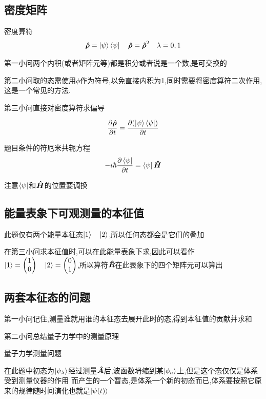 \documentclass{article}
\begin{document}
        \subsection{密度矩阵}

        \begin{formal}
            密度算符
            $$ \vu*{\rho} = \ket{\psi} \bra{\psi} \quad \vu*{\rho} =  \vu*{\rho}^{2} \quad \lambda = 0,1$$
        \end{formal}
            第一小问两个内积(或者矩阵元等)都是积分或者说是一个数,是可交换的
            
            第二小问取的态需使用$\phi$作为符号,以免直接内积为1,同时需要将密度算符二次作用,这是一个常见的方法.

            第三小问直接对密度算符求偏导

            $$ \pdv{\vu*{\rho}}{t} = \pdv{(\ket{\psi} \bra{\psi})}{t} $$

            题目条件的符厄米共轭方程
            $$ -i\hbar \pdv{\bra{\psi}}{t} = \bra{\psi} \vu*{H}  $$

            注意$\bra{\psi}$和$\vu*{H}$的位置要调换
        \subsection{能量表象下可观测量的本征值}
            此题仅有两个能量本征态$\ket{1} \quad \ket{2}$,所以任何态都会是它们的叠加

            在第三小问求本征值时,可以在此能量表象下求,因此可以看作$\ket{1} = \mqty(1 \\ 0) \quad \ket{2} = \mqty(0 \\ 1)$,所以算符$\vu*{R}$在此表象下的四个矩阵元可以算出

        \subsection{两套本征态的问题}
            第一小问记住,测量谁就用谁的本征态去展开此时的态,得到本征值的贡献并求和

            第二小问总结量子力学中的测量原理
            \begin{formal}
                
                量子力学测量问题

                在此题中初态为$\ket{\psi_{\lambda}}$经过测量$\vu*{A}$后,波函数坍缩到某$\ket{\phi_{n}}$上,但是这个态仅仅是体系受到测量仪器的作用
                而产生的一个暂态,是体系一个新的初态而已,体系要按照它原来的规律随时间演化也就是$\ket{\psi(t)}$
            \end{formal}
\end{document}
